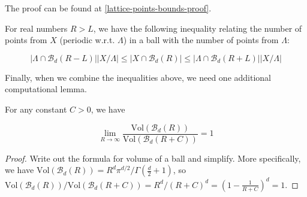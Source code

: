 The proof can be found at \cref{lattice-points-bounds-proof}.

\begin{theorem}\label{periodic-points-bounds}
  For real numbers $R > L$, we have the following inequality relating the number of points from $X$ (periodic w.r.t. $\Lambda$) in a ball with the number of points from $\Lambda$:

  \[
    \left|\Lambda \cap \mathcal{B}_d(R - L)\right|\left|X / \Lambda\right|
    \leq \left|X \cap \mathcal{B}_d(R)\right|
    \leq \left|\Lambda \cap \mathcal{B}_d(R + L)\right|\left|X / \Lambda\right|
  \]
\end{theorem}


Finally, when we combine the inequalities above, we need one additional computational lemma.

\begin{lemma}\label{volume-ball-ratio}
  For any constant $C > 0$, we have

  \[
    \lim_{R \to \infty} \frac{\mathrm{Vol}(\mathcal{B}_d(R))}{\mathrm{Vol}(\mathcal{B}_d(R + C))} = 1
  \]
\end{lemma}
\begin{proof}
  Write out the formula for volume of a ball and simplify. More specifically, we have $\mathrm{Vol}(\mathcal{B}_d(R)) = R^d \pi^{d / 2} / \Gamma\left(\frac{d}{2} + 1\right)$, so $\mathrm{Vol}(\mathcal{B}_d(R)) / \mathrm{Vol}(\mathcal{B}_d(R + C)) = R^d / (R + C)^d = \left(1 - \frac{1}{R + C}\right)^d = 1$.
\end{proof}

%

